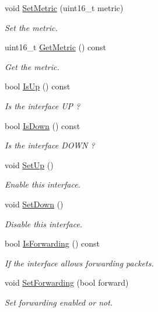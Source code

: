 \begin{DoxyCompactItemize}
void \hyperlink{classns3_1_1Ipv6Interface_ac3cc4aaf08fe4d2a217e0b8eebd7fe10}{Set\+Metric} (uint16\+\_\+t metric)
\begin{DoxyCompactList}\small\item\em Set the metric. \end{DoxyCompactList}\item 
uint16\+\_\+t \hyperlink{classns3_1_1Ipv6Interface_a606ec415c1f22979f3af47779c47c9c1}{Get\+Metric} () const 
\begin{DoxyCompactList}\small\item\em Get the metric. \end{DoxyCompactList}\item 
bool \hyperlink{classns3_1_1Ipv6Interface_acbf489ce5626123d75517db20de7dbbf}{Is\+Up} () const 
\begin{DoxyCompactList}\small\item\em Is the interface UP ? \end{DoxyCompactList}\item 
bool \hyperlink{classns3_1_1Ipv6Interface_ab3024c2afd72edabaffb56941c34f084}{Is\+Down} () const 
\begin{DoxyCompactList}\small\item\em Is the interface D\+O\+WN ? \end{DoxyCompactList}\item 
void \hyperlink{classns3_1_1Ipv6Interface_a9db98f98cc682a2395fe582bfb511880}{Set\+Up} ()
\begin{DoxyCompactList}\small\item\em Enable this interface. \end{DoxyCompactList}\item 
void \hyperlink{classns3_1_1Ipv6Interface_a5302f39e1aa13505c14bca39e4b6ed3b}{Set\+Down} ()
\begin{DoxyCompactList}\small\item\em Disable this interface. \end{DoxyCompactList}\item 
bool \hyperlink{classns3_1_1Ipv6Interface_a7ef56aa34f688350d9902553dd35149c}{Is\+Forwarding} () const 
\begin{DoxyCompactList}\small\item\em If the interface allows forwarding packets. \end{DoxyCompactList}\item 
void \hyperlink{classns3_1_1Ipv6Interface_a3e83e4865d56c4ddbde368a643094c88}{Set\+Forwarding} (bool forward)
\begin{DoxyCompactList}\small\item\em Set forwarding enabled or not. \end{DoxyCompactList}\item 

\end{DoxyCompactItemize}
